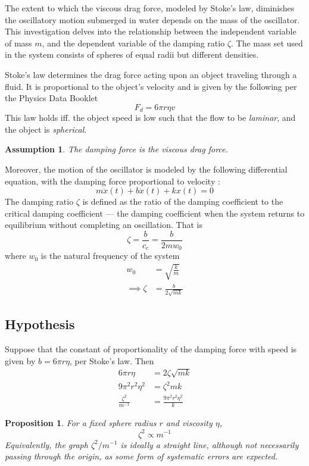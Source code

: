 \documentclass[a4paper,12pt]{article}
\newtheorem{proposition}{Proposition}
\newtheorem{assumption}{Assumption}
\begin{document}
The extent to which the viscous drag force, modeled by Stoke's law, diminishes the oscillatory motion submerged in water depends on the mass of the oscillator. This investigation delves into the relationship between the independent variable of mass $m$, and the dependent variable of the damping ratio $\zeta$. The mass set used in the system consists of spheres of equal radii but different densities.

Stoke's law determines the drag force acting upon an object traveling through a fluid. It is proportional to the object's velocity and is given by the following per the Physics Data Booklet
$$F_d = 6\pi r \eta v$$
This law holds iff. the object speed is low such that the flow to be \textit{laminar}, and the object is \textit{spherical}.

\begin{assumption}
  \label{as:1}
  The damping force is the viscous drag force.
\end{assumption}

Moreover, the motion of the oscillator is modeled by the following differential equation, with the damping force proportional to velocity \parencite{miller_2004_13}:
\begin{equation}
  \label{eq:1}
  m\ddot{x}(t) + b\dot{x}(t) + kx(t) = 0
\end{equation}
The damping ratio $\zeta$ is defined as the ratio of the damping coefficient to the critical damping coefficient --- the damping coefficient when the system returns to equilibrium without completing an oscillation. That is $$\zeta = \frac{b}{c_c} = \frac{b}{2mw_0}$$
where $w_0$ is the natural frequency of the system
\begin{align*}
  w_0            & = \sqrt{\frac{k}{m}}   \\
  \implies \zeta & = \frac{b}{2\sqrt{mk}}
\end{align*}

\subsection{Hypothesis}

Suppose that the constant of proportionality of the damping force with speed is given by $b = 6\pi r \eta$, per Stoke's law. Then
\begin{align*}
  6\pi r \eta            & = 2\zeta \sqrt{mk}            \\
  9\pi^2 r^2 \eta^2      & = \zeta^2mk                   \\
  \frac{\zeta^2}{m^{-1}} & = \frac{9\pi^2 r^2 \eta^2}{k}
\end{align*}
\begin{proposition}
  \label{prop:1}
  For a fixed sphere radius $r$ and viscosity $\eta$, \begin{equation}\label{eq:2}
    \zeta^2 \propto m^{-1}
  \end{equation}
  Equivalently, the graph $\zeta^2/m^{-1}$ is ideally a straight line, although not necessarily passing through the origin, as some form of systematic errors are expected.
\end{proposition}
\end{document}
